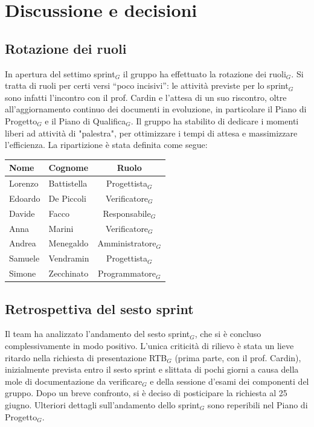 \documentclass[a4paper, 10pt, colorlinks=true, linkcolor=black, urlcolor=blue, citecolor=blue, hidelinks]{article}
\begin{document}
\section{Discussione e decisioni}

\subsection{Rotazione dei ruoli}
In apertura del settimo sprint$_G$ il gruppo ha effettuato la rotazione dei ruoli$_G$. Si tratta di ruoli per certi versi ``poco incisivi'': le attività previste per lo sprint$_G$ sono infatti l'incontro con il prof. Cardin e l'attesa di un suo riscontro, oltre all'aggiornamento continuo dei documenti in evoluzione, in particolare il Piano di Progetto$_G$ e il Piano di Qualifica$_G$. Il gruppo ha stabilito di dedicare i momenti liberi ad attività di "palestra", per ottimizzare i tempi di attesa e massimizzare l'efficienza. La ripartizione è stata definita come segue:
\begin{center}
    \begin{tabular}{|l|l|c|}
        \hline
        \textbf{Nome} & \textbf{Cognome} & \textbf{Ruolo} \\
        \hline
        Lorenzo & Battistella & Progettista$_G$ \\
        \hline
        Edoardo & De Piccoli & Verificatore$_G$ \\
        \hline
        Davide & Facco & Responsabile$_G$ \\
        \hline
        Anna & Marini & Verificatore$_G$ \\
        \hline
        Andrea & Menegaldo & Amministratore$_G$ \\
        \hline
        Samuele & Vendramin & Progettista$_G$ \\
        \hline
        Simone & Zecchinato & Programmatore$_G$ \\
        \hline
    \end{tabular}
\end{center}

\subsection{Retrospettiva del sesto sprint}
Il team ha analizzato l'andamento del sesto sprint$_G$, che si è concluso complessivamente in modo positivo. L'unica criticità di rilievo è stata un lieve ritardo nella richiesta di presentazione RTB$_G$ (prima parte, con il prof. Cardin), inizialmente prevista entro il sesto sprint e slittata di pochi giorni a causa della mole di documentazione da verificare$_G$ e della sessione d'esami dei componenti del gruppo. Dopo un breve confronto, si è deciso di posticipare la richiesta al 25 giugno. Ulteriori dettagli sull'andamento dello sprint$_G$ sono reperibili nel Piano di Progetto$_G$.
\end{document}

